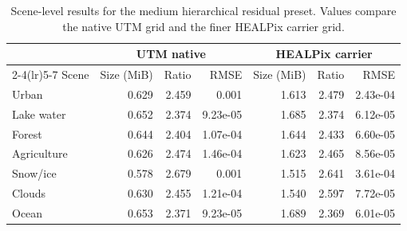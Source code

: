 \begin{table}[t]
\centering
\caption{Scene-level results for the medium hierarchical residual preset. Values compare the native UTM grid and the finer HEALPix carrier grid.}
\label{tab:medium_landcover}
\begin{tabular}{@{}lrrrrrr@{}}
\toprule
& \multicolumn{3}{c}{UTM native} & \multicolumn{3}{c}{HEALPix carrier} \\
\cmidrule(lr){2-4}\cmidrule(lr){5-7}
Scene & Size (MiB) & Ratio & RMSE & Size (MiB) & Ratio & RMSE \\
\midrule
Urban & 0.629 & 2.459 & 0.001 & 1.613 & 2.479 & 2.43e-04 \\
Lake water & 0.652 & 2.374 & 9.23e-05 & 1.685 & 2.374 & 6.12e-05 \\
Forest & 0.644 & 2.404 & 1.07e-04 & 1.644 & 2.433 & 6.60e-05 \\
Agriculture & 0.626 & 2.474 & 1.46e-04 & 1.623 & 2.465 & 8.56e-05 \\
Snow/ice & 0.578 & 2.679 & 0.001 & 1.515 & 2.641 & 3.61e-04 \\
Clouds & 0.630 & 2.455 & 1.21e-04 & 1.540 & 2.597 & 7.72e-05 \\
Ocean & 0.653 & 2.371 & 9.23e-05 & 1.689 & 2.369 & 6.01e-05 \\
\bottomrule
\end{tabular}
\end{table}
